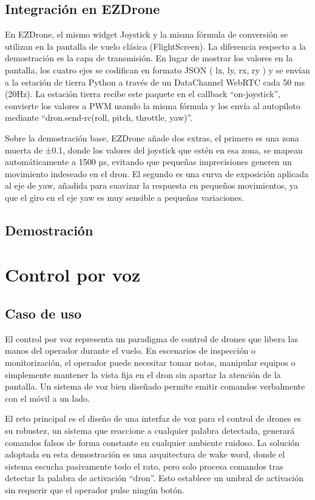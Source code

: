 \subsection{Integración en EZDrone}
En EZDrone, el mismo widget Joystick y la misma fórmula de conversión se utilizan en la pantalla de vuelo clásica (FlightScreen). La diferencia respecto a la demostración es la capa de transmisión. En lugar de mostrar los valores en la pantalla, los cuatro ejes se codifican en formato JSON ( {lx, ly, rx, ry} ) y se envían a la estación de tierra Python a través de un DataChannel WebRTC cada 50 ms (20Hz). La estación tierra recibe este paquete en el callback “on-joystick”, convierte los valores a PWM usando la misma fórmula y los envía al autopiloto mediante “dron.send-rc(roll, pitch, throttle, yaw)”.

Sobre la demostración base, EZDrone añade dos extras, el primero es una zona muerta de  ±0.1, donde los valores del joystick que estén en esa zona, se mapean automáticamente a 1500 µs, evitando que pequeñas imprecisiones generen un movimiento indeseado en el dron. El segundo es una curva de exposición aplicada al eje de yaw, añadida para suavizar la respuesta en pequeños movimientos, ya que el giro en el eje yaw es muy sensible a pequeñas variaciones.

\subsection{Demostración}

\section{Control por voz}
\subsection{Caso de uso}
El control por voz representa un paradigma de control de drones que libera las manos del operador durante el vuelo. En escenarios de inspección o monitorización, el operador puede necesitar tomar notas, manipular equipos o simplemente mantener la vista fija en el dron sin apartar la atención de la pantalla. Un sistema de voz bien diseñado permite emitir comandos verbalmente con el móvil a un lado.

El reto principal es el diseño de una interfaz de voz para el control de drones es su robustez, un sistema que reaccione a cualquier palabra detectada, generará comandos falsos de forma constante en cualquier ambiente ruidoso. La solución adoptada en esta demostración es una arquitectura de wake word, donde el sistema escucha pasivamente todo el rato, pero solo procesa comandos tras detectar la palabra de activación “dron”. Esto establece un umbral de activación sin requerir que el operador pulse ningún botón.

